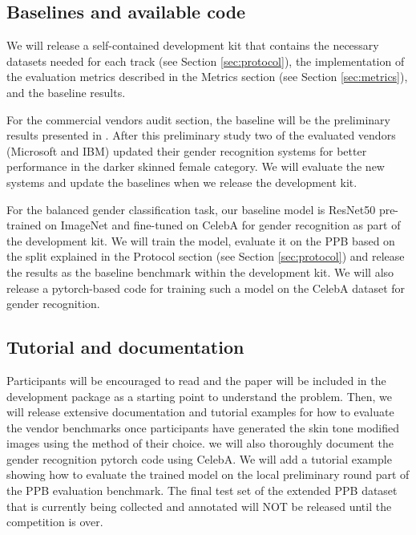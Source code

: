 \documentclass[11pt, oneside]{article}
\makeatletter
\let\@internalcite\cite
\def\cite{\def\citeauthoryear##1##2{##1, ##2}\@internalcite}
\makeatother
\begin{document}
\subsection{Baselines and available code}

We will release a self-contained development kit that contains the necessary 
datasets needed for each track (see Section \ref{sec:protocol}), the 
implementation of the evaluation metrics described in the Metrics section (see 
Section \ref{sec:metrics}), and the baseline results.

For the commercial vendors audit section, the baseline will be the preliminary 
results presented in \cite{buolamwini2018gender}. After this preliminary study 
two of the evaluated vendors (Microsoft and IBM) updated their gender 
recognition systems for better performance in the darker skinned female category. We 
will evaluate the new systems and update the baselines when we release the 
development kit.

For the balanced gender classification task, our baseline model is ResNet50 
pre-trained on ImageNet and fine-tuned on CelebA for gender recognition as part 
of the development kit. We will train the model, evaluate it on the PPB based on 
the split explained in the Protocol section (see Section \ref{sec:protocol}) 
and release the results as the baseline benchmark within the development kit. 
We will also release a pytorch-based code for training such a model on the 
CelebA dataset for gender recognition.

\subsection{Tutorial and documentation}

Participants will be encouraged to read \cite{buolamwini2018gender} and the 
paper will be included in the development package as a starting point to 
understand the problem. Then, we will release extensive documentation and 
tutorial examples for how to evaluate the vendor benchmarks once participants 
have generated the skin tone modified images using the method of their choice. 
we will also thoroughly document the gender recognition pytorch code using 
CelebA. We will add a tutorial example showing how to evaluate the trained 
model on the local preliminary round part of the PPB evaluation benchmark. The 
final test set of the extended PPB dataset that is currently being collected 
and annotated will NOT be released until the competition is over.
\end{document}
